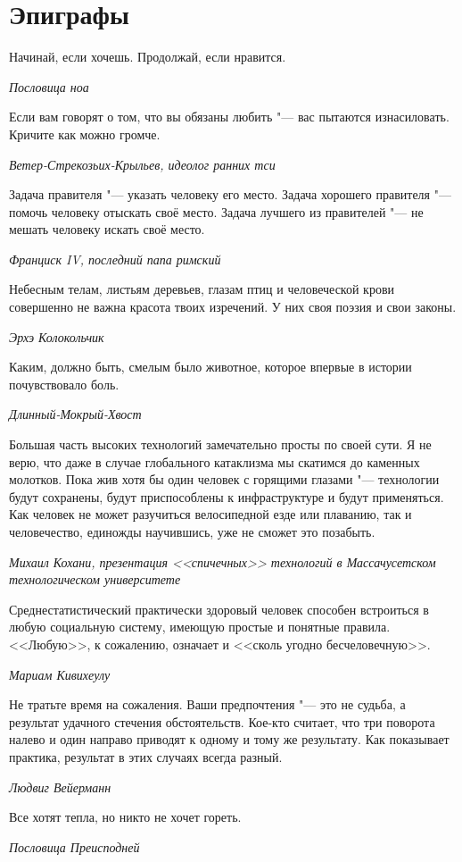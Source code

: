 \documentclass[a4paper,10pt,fleqn]{book}
\newcommand{\mulang}[3]{#2}%
\begin{document}
\tableofcontents

\chapter{Эпиграфы}

\epigraph{\mulang{}{Начинай, если хочешь.}
{Begin if you want.}
\mulang{}{Продолжай, если нравится.}
{Continue if you like.}}
{\textit{Пословица ноа}}

\epigraph{Если вам говорят о том, что вы обязаны любить "--- вас пытаются изнасиловать.
Кричите как можно громче.}
{\textit{Ветер-Стрекозьих-Крыльев, идеолог ранних тси}}

\epigraph{Задача правителя "--- указать человеку его место.
Задача хорошего правителя "--- помочь человеку отыскать своё место.
Задача лучшего из правителей "--- не мешать человеку искать своё место.}
{\textit{Франциск IV, последний папа римский}}

\epigraph{Небесным телам, листьям деревьев, глазам птиц и человеческой крови совершенно не важна красота твоих изречений.
У них своя поэзия и свои законы.}
{\textit{Эрхэ Колокольчик}}

\epigraph{Каким, должно быть, смелым было животное, которое впервые в истории почувствовало боль.}
{\textit{Длинный-Мокрый-Хвост}}

\epigraph{Большая часть высоких технологий замечательно просты по своей сути.
Я не верю, что даже в случае глобального катаклизма мы скатимся до каменных молотков.
Пока жив хотя бы один человек с горящими глазами "--- технологии будут сохранены, будут приспособлены к инфраструктуре и будут применяться.
Как человек не может разучиться велосипедной езде или плаванию, так и человечество, единожды научившись, уже не сможет это позабыть.}
{\textit{Михаил Кохани, презентация <<спичечных>> технологий в Массачусетском технологическом университете}}

\epigraph{Среднестатистический практически здоровый человек способен встроиться в любую социальную систему, имеющую простые и понятные правила.
<<Любую>>, к сожалению, означает и <<сколь угодно бесчеловечную>>.}
{\textit{Мариам Кивихеулу}}

\epigraph{Не тратьте время на сожаления.
Ваши предпочтения "--- это не судьба, а результат удачного стечения обстоятельств.
Кое-кто считает, что три поворота налево и один направо приводят к одному и тому же результату.
Как показывает практика, результат в этих случаях всегда разный.}
{\textit{Людвиг Вейерманн}}

\epigraph{Все хотят тепла, но никто не хочет гореть.}
{\textit{Пословица Преисподней}}
\end{document}
